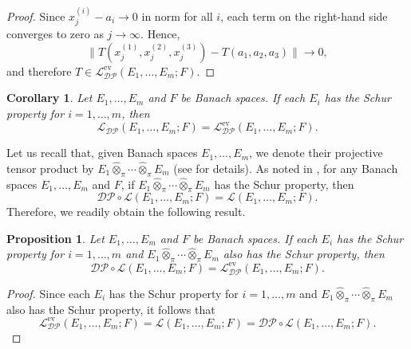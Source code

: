 \documentclass[12 pt]{article}%
\newtheorem{proposition}[theorem]{Proposition}
\newtheorem{corollary}[theorem]{Corollary}
\newtheorem{final remark}[theorem]{Final Remark}
\begin{document}
\begin{proof}
	Since $x_j^{(i)} - a_i \to 0$ in norm for all $i$, each term on the right-hand side converges to zero as $j \to \infty$. Hence,
	\begin{equation*}
		\|T(x_j^{(1)},x_j^{(2)},x_j^{(3)}) - T(a_1,a_2,a_3)\| \to 0,
	\end{equation*}
	and therefore $T \in \mathcal{L_{DP}^{\mathrm{ev}}}(E_1,\dots,E_m;F)$.
\end{proof}

\begin{corollary}
	Let $E_1,\dots,E_m$ and $F$ be Banach spaces. If each $E_i$ has the Schur property for $i=1,\dots,m$, then
	\[
	\mathcal{L_{DP}}(E_1,\dots,E_m;F) = \mathcal{L_{DP}^{\mathrm{ev}}}(E_1,\dots,E_m;F).
	\]
\end{corollary}

Let us recall that, given Banach spaces $E_1,\dots,E_m$, we denote their projective tensor product by $E_1 \hat{\otimes}_{\pi} \cdots \hat{\otimes}_{\pi} E_m$ (see \cite{R02} for details). As noted in \cite[Section 4]{BT15}, for any Banach spaces $E_1,\dots,E_m$ and $F$, if $E_1 \hat{\otimes}_{\pi} \cdots \hat{\otimes}_{\pi} E_m$ has the Schur property, then
\begin{equation*}
	\mathcal{DP} \circ \mathcal{L}(E_1,\dots,E_m;F) = \mathcal{L}(E_1,\dots,E_m;F).
\end{equation*}
Therefore, we readily obtain the following result.

\begin{proposition}
	Let $E_1,\dots,E_m$ and $F$ be Banach spaces. If each $E_i$ has the Schur property for $i=1,\dots,m$ and $E_1 \hat{\otimes}_{\pi} \cdots \hat{\otimes}_{\pi} E_m$ also has the Schur property, then
	\begin{equation*}
		\mathcal{DP} \circ \mathcal{L}(E_1,\dots,E_m;F)
		= \mathcal{L_{DP}^{\mathrm{ev}}}(E_1,\dots,E_m;F).
	\end{equation*}
\end{proposition}

\begin{proof}
	Since each $E_i$ has the Schur property for $i=1,\dots,m$ and $E_1 \hat{\otimes}_{\pi} \cdots \hat{\otimes}_{\pi} E_m$ also has the Schur property, it follows that
	\begin{equation*}
		\mathcal{L_{DP}^{\mathrm{ev}}}(E_1,\dots,E_m;F)
		= \mathcal{L}(E_1,\dots,E_m;F)
		= \mathcal{DP} \circ \mathcal{L}(E_1,\dots,E_m;F).
	\end{equation*}
\end{proof}
\end{document}
